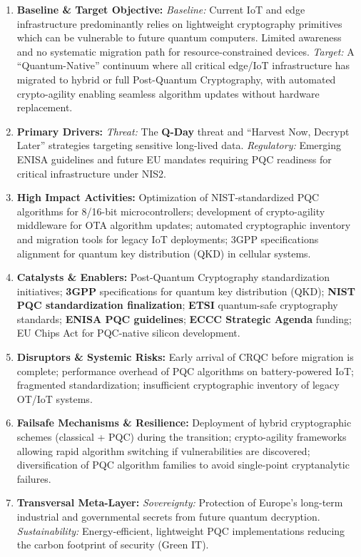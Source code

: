 \documentclass[12pt,a4paper]{article}
\begin{document}
\begin{enumerate}
\item \textbf{Baseline \& Target Objective:}
\textit{Baseline:} Current IoT and edge infrastructure predominantly relies on lightweight cryptography primitives which can be vulnerable to future quantum computers. Limited awareness and no systematic migration path for resource-constrained devices.
\textit{Target:} A ``Quantum-Native'' continuum where all critical edge/IoT infrastructure has migrated to hybrid or full Post-Quantum Cryptography, with automated crypto-agility enabling seamless algorithm updates without hardware replacement.

\item \textbf{Primary Drivers:} 
\textit{Threat:} The \textbf{Q-Day} threat and ``Harvest Now, Decrypt Later'' strategies targeting sensitive long-lived data.
\textit{Regulatory:} Emerging ENISA guidelines and future EU mandates requiring PQC readiness for critical infrastructure under NIS2.

\item \textbf{High Impact Activities:} 
Optimization of NIST-standardized PQC algorithms for 8/16-bit microcontrollers; development of crypto-agility middleware for OTA algorithm updates; automated cryptographic inventory and migration tools for legacy IoT deployments; 3GPP specifications alignment for quantum key distribution (QKD) in cellular systems.

\item \textbf{Catalysts \& Enablers:} Post-Quantum Cryptography standardization initiatives; \textbf{3GPP} specifications for quantum key distribution (QKD); \textbf{NIST PQC standardization finalization}; \textbf{ETSI} quantum-safe cryptography standards; \textbf{ENISA PQC guidelines}; \textbf{ECCC Strategic Agenda} funding; EU Chips Act for PQC-native silicon development.

\item \textbf{Disruptors \& Systemic Risks:} 
Early arrival of CRQC before migration is complete; performance overhead of PQC algorithms on battery-powered IoT; fragmented standardization; insufficient cryptographic inventory of legacy OT/IoT systems.

\item \textbf{Failsafe Mechanisms \& Resilience:} 
Deployment of hybrid cryptographic schemes (classical + PQC) during the transition; crypto-agility frameworks allowing rapid algorithm switching if vulnerabilities are discovered; diversification of PQC algorithm families to avoid single-point cryptanalytic failures.

\item \textbf{Transversal Meta-Layer:} 
\textit{Sovereignty:} Protection of Europe's long-term industrial and governmental secrets from future quantum decryption. \textit{Sustainability:} Energy-efficient, lightweight PQC implementations reducing the carbon footprint of security (Green IT).

\end{enumerate}
\end{document}
